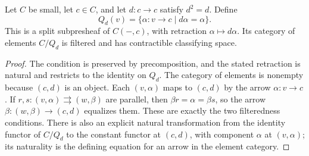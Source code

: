\begin{lemma}\label{E:idempotent}
Let $C$ be small, let $c\in C$, and let $d:c\to c$ satisfy $d^2=d$. Define
\[
 Q_d(v)=\{\alpha:v\to c\mid d\alpha=\alpha\}.
\]
This is a split subpresheaf of $C(-,c)$, with retraction $\alpha\mapsto d\alpha$. Its category of elements $C/Q_d$ is filtered and has contractible classifying space.
\end{lemma}
\begin{proof}
The condition is preserved by precomposition, and the stated retraction is natural and restricts to the identity on $Q_d$. The category of elements is nonempty because $(c,d)$ is an object. Each $(v,\alpha)$ maps to $(c,d)$ by the arrow $\alpha:v\to c$. If $r,s:(v,\alpha)\rightrightarrows(w,\beta)$ are parallel, then $\beta r=\alpha=\beta s$, so the arrow $\beta:(w,\beta)\to(c,d)$ equalizes them. These are exactly the two filteredness conditions. There is also an explicit natural transformation from the identity functor of $C/Q_d$ to the constant functor at $(c,d)$, with component $\alpha$ at $(v,\alpha)$; its naturality is the defining equation for an arrow in the element category.
\end{proof}

